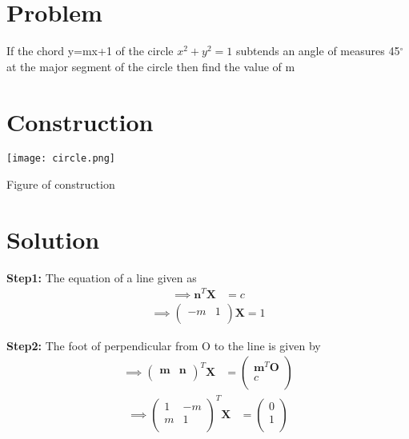 \documentclass[10pt, a4paper]{article}
\title{\mytitle}
\author{\myauthor\hspace{1em}\\\contact\\FWC22059\hspace{6.5em}IITH\hspace{0.5em}\mymodule\hspace{6em}Assignment}
\let\vec\mathbf
\begin{document}
	\maketitle
	\tableofcontents
   \section{Problem}
  If the chord y=mx+1 of the circle $x^2+y^2=1$ subtends an angle of measures 45$^{\circ}$ at the major segment of the circle then find the value of m
\section{Construction}
  \texttt{[image: circle.png]}
  	\begin{center}
  Figure of construction
  	\end{center}
  \section{Solution}
\textbf{Step1:}
The equation of a line given as
\begin{align}
\implies\vec{n}^T\vec{X} &= c
\end{align}
\begin{align}
\implies\begin{pmatrix}-m & 1 \\ \end{pmatrix}\vec{X}=1
\end{align}

\textbf{Step2:}
The foot of perpendicular from O to the line is given by
\begin{align}
\implies\begin{pmatrix}\vec{m} & \vec{n} \\ \end{pmatrix}^T\vec{X} &= \begin{pmatrix}\vec{m}^T\vec{O} \\ c \\ \end{pmatrix}
\end{align}
\begin{align}
\implies\begin{pmatrix}1 & -m \\m & 1 \\ \end{pmatrix}^T\vec{X} &= \begin{pmatrix}0 \\ 1 \\ \end{pmatrix}
\end{align}
\end{document}
